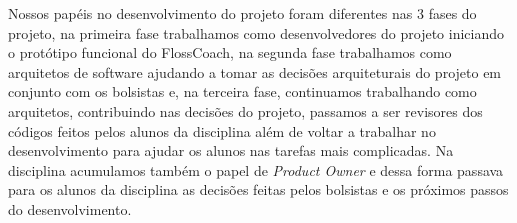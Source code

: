 Nossos papéis no desenvolvimento do projeto foram diferentes nas 3 fases do projeto, na 
primeira fase trabalhamos como desenvolvedores do projeto iniciando o protótipo funcional
do FlossCoach, na segunda fase trabalhamos como arquitetos de software ajudando a tomar as
decisões arquiteturais do projeto em conjunto com os bolsistas e, na terceira fase,
continuamos trabalhando como arquitetos, contribuindo nas decisões do projeto, passamos a ser
revisores dos códigos feitos pelos alunos da disciplina além de voltar a trabalhar no
desenvolvimento para ajudar os alunos nas tarefas mais complicadas. Na disciplina 
acumulamos também o papel de \textit{Product Owner} e dessa forma passava para os alunos da disciplina
as decisões feitas pelos bolsistas e os próximos passos do desenvolvimento. 


